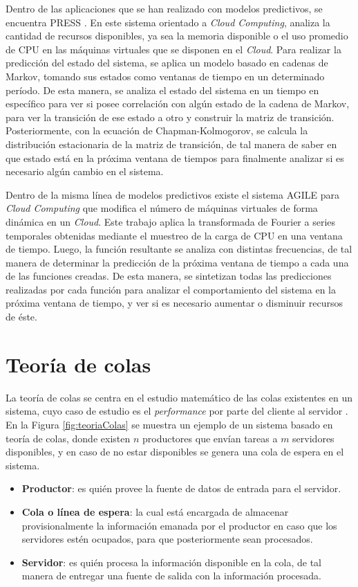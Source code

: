 Dentro de las aplicaciones que se han realizado con modelos predictivos, se encuentra PRESS \citep{GongGW10}. En este sistema orientado a \textit{Cloud Computing}, analiza la cantidad de recursos disponibles, ya sea la memoria disponible o el uso promedio de CPU en las máquinas virtuales que se disponen en el \textit{Cloud}. Para realizar la predicción del estado del sistema, se aplica un modelo basado en cadenas de Markov, tomando sus estados como ventanas de tiempo en un determinado período. De esta manera, se analiza el estado del sistema en un tiempo en específico para ver si posee correlación con algún estado de la cadena de Markov, para ver la transición de ese estado a otro y construir la matriz de transición. Posteriormente, con la ecuación de Chapman-Kolmogorov, se calcula la distribución estacionaria de la matriz de transición, de tal manera de saber en que estado está en la próxima ventana de tiempos para finalmente analizar si es necesario algún cambio en el sistema.

Dentro de la misma línea de modelos predictivos existe el sistema AGILE \citep{NguyenSGSW13} para \textit{Cloud Computing} que modifica el número de máquinas virtuales de forma dinámica en un \textit{Cloud}. Este trabajo aplica la transformada de Fourier \citep{falk2012first} a series temporales obtenidas mediante el muestreo de la carga de CPU en una ventana de tiempo. Luego, la función resultante se analiza con distintas frecuencias, de tal manera de determinar la predicción de la próxima ventana de tiempo a cada una de las funciones creadas. De esta manera, se sintetizan todas las predicciones realizadas por cada función para analizar el comportamiento del sistema en la próxima ventana de tiempo, y ver si es necesario aumentar o disminuir recursos de éste.

\section{Teoría de colas}
\label{sec:teoriaColas}

La teoría de colas se centra en el estudio matemático de las colas existentes en un sistema, cuyo caso de estudio es el \textit{performance} por parte del cliente al servidor \citep{cooper1972introduction}. En la Figura \ref{fig:teoriaColas} se muestra un ejemplo de un sistema basado en teoría de colas, donde existen $n$ productores que envían tareas a $m$ servidores disponibles, y en caso de no estar disponibles se genera una cola de espera en el sistema.

\begin{itemize}
	\item \textbf{Productor}: es quién provee la fuente de datos de entrada para el servidor.
	\item \textbf{Cola o línea de espera}: la cual está encargada de almacenar provisionalmente la información emanada por el productor en caso que los servidores estén ocupados, para que posteriormente sean procesados.
	\item \textbf{Servidor}: es quién procesa la información disponible en la cola, de tal manera de entregar una fuente de salida con la información procesada.
\end{itemize}

